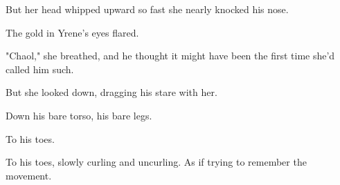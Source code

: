 But her head whipped upward so fast she nearly knocked his nose.

The gold in Yrene's eyes flared.

"Chaol," she breathed, and he thought it might have been the first time she'd called him such.

But she looked down, dragging his stare with her.

Down his bare torso, his bare legs.

To his toes.

To his toes, slowly curling and uncurling. As if trying to remember the movement.

